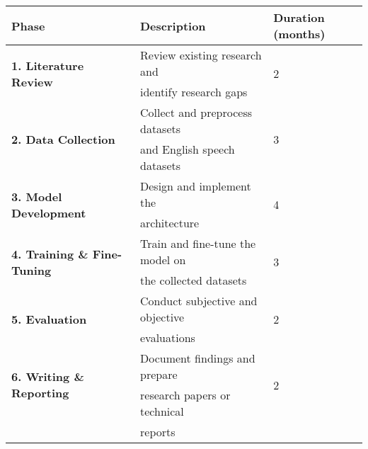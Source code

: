 \begin{table}[h!]
    \centering
    \begin{tabular}{lll}


    \toprule
    \textbf{Phase} & \textbf{Description} & \textbf{Duration (months)} \\
    \midrule
    \multirow{2}{*}{\textbf{1. Literature Review}} & Review existing research and & \multirow{2}{*}{2} \\
     & identify research gaps &  \\
     
    
     \midrule
    \multirow{2}{*}{\textbf{2. Data Collection}} & Collect and preprocess datasets & \multirow{2}{*}{3} \\
     & and English speech datasets & \\
    
     \midrule
    \multirow{2}{*}{\textbf{3. Model Development}} & Design and implement the & \multirow{2}{*}{4} \\
     & architecture &  \\

    \midrule
    \multirow{2}{*}{\textbf{4. Training \& Fine-Tuning}} & Train and fine-tune the model on & \multirow{2}{*}{3} \\
     & the collected datasets & \\
    
    \midrule
    \multirow{2}{*}{\textbf{5. Evaluation}} & Conduct subjective and objective & \multirow{2}{*}{2} \\
     & evaluations & \\
    
    \midrule
    \multirow{2}{*}{\textbf{6. Writing \& Reporting}} & Document findings and prepare & \multirow{2}{*}{2} \\
     & research papers or technical & \\
     & reports & \\
    \bottomrule
    \end{tabular}
\end{table}


